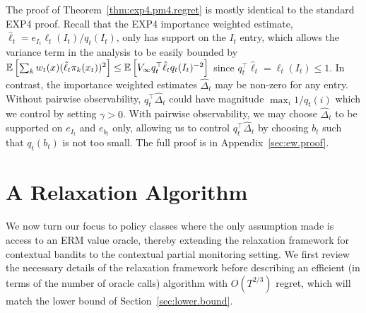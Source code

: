 \documentclass{article}
\begin{document}
The proof of Theorem~\ref{thm:exp4.pm4.regret} is mostly identical to the standard \textsc{EXP4} proof. Recall that the \textsc{EXP4} importance weighted estimate, $\hat\ell_t = e_{I_t}\ell_t(I_t)/q_t(I_t)$, only has support on the $I_t$ entry, which allows the variance term in the analysis to be easily bounded by
$
\mathbb E\left[\sum_k w_t(x) (\hat\ell_t \pi_k(x_t))^2\right]
\leq
\mathbb E\left[V_\infty q_t^\top \hat\ell_t q_t(I_t)^{-2}\right]
$
since $q_t^\top \hat\ell_t = \ell_t(I_t)\leq 1$. In contrast, the importance weighted estimates $\hat\Delta_t$ may be non-zero for any entry. Without pairwise observability,  $q_t^\top \hat\Delta_t$ could have magnitude $\max_i 1/q_t(i)$ which we control by setting $\gamma > 0$. With pairwise observability, we may choose $\hat\Delta_t$ to be supported on $e_{I_t}$ and $e_{b_t}$ only, allowing us to control $q_t^\top \hat\Delta_t$ by choosing $b_t$ such that $q_t(b_t)$ is not too small. The full proof is in Appendix~\ref{sec:ew.proof}.

\section{A Relaxation Algorithm}
\label{sec:relaxation}
We now turn our focus to policy classes where the only assumption made is access to an ERM value oracle, thereby extending the relaxation framework for contextual bandits \citep{rakhlin2016bistro} to the contextual partial monitoring setting. We first review the necessary details of the relaxation framework before describing an efficient (in terms of the number of oracle calls) algorithm with $O(T^{2/3})$ regret, which will match the lower bound of Section~\ref{sec:lower.bound}.
\end{document}
